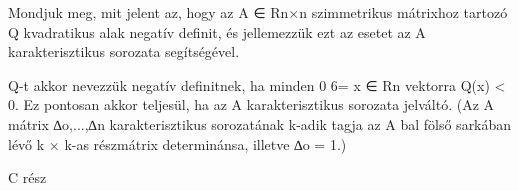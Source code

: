 \begin{frame}
  \begin{tcolorbox}[title={46}]
     Mondjuk meg, mit jelent az, hogy az A ∈ Rn×n szimmetrikus mátrixhoz tartozó Q kvadratikus alak negatív deﬁnit, és jellemezzük ezt az esetet az A karakterisztikus sorozata segítségével.

  \tcblower
Q-t akkor nevezzük negatív deﬁnitnek, ha minden 0 6= x ∈ Rn vektorra Q(x) < 0. Ez pontosan akkor teljesül, ha az A karakterisztikus sorozata jelváltó. (Az A mátrix ∆o,...,∆n karakterisztikus sorozatának k-adik tagja az A bal fölső sarkában lévő k × k-as részmátrix determinánsa, illetve ∆o = 1.)

  \end{tcolorbox}
\end{frame}





























\begin{frame}[plain]
\begin{tcolorbox}[center, colback={myyellow}, coltext={black}, colframe={myyellow}]
    {\RHuge C rész}
    \mmedskip
\end{tcolorbox}
\end{frame}

